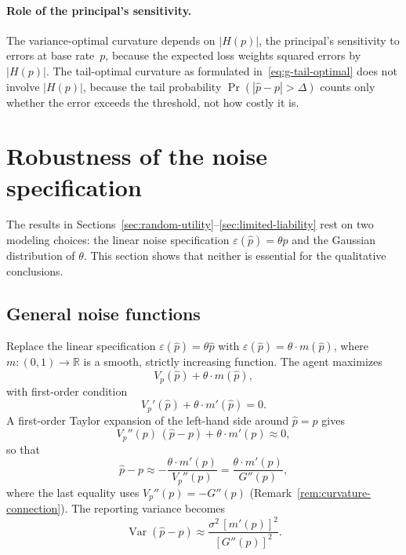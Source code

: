 \documentclass[11pt]{article}
\begin{document}
\paragraph{Role of the principal's sensitivity.} The variance-optimal curvature depends on $|H(p)|$, the principal's sensitivity to errors at base rate~$p$, because the expected loss weights squared errors by $|H(p)|$. The tail-optimal curvature as formulated in~\eqref{eq:g-tail-optimal} does not involve $|H(p)|$, because the tail probability $\Pr(|\hat{p} - p| > \Delta)$ counts only whether the error exceeds the threshold, not how costly it is. 

\section{Robustness of the noise specification}\label{sec:robustness}

The results in Sections~\ref{sec:random-utility}--\ref{sec:limited-liability} rest on two modeling choices: the linear noise specification $\varepsilon(\hat{p}) = \theta\hat{p}$ and the Gaussian distribution of $\theta$. This section shows that neither is essential for the qualitative conclusions.

\subsection{General noise functions}

Replace the linear specification $\varepsilon(\hat{p}) = \theta\hat{p}$ with $\varepsilon(\hat{p}) = \theta \cdot m(\hat{p})$, where $m \colon (0,1) \to \mathbb{R}$ is a smooth, strictly increasing function. The agent maximizes
\[
V_p(\hat{p}) + \theta \cdot m(\hat{p}),
\]
with first-order condition
\begin{equation}\label{eq:general-foc}
V_p'(\hat{p}) + \theta \cdot m'(\hat{p}) = 0.
\end{equation}
A first-order Taylor expansion of the left-hand side around $\hat{p} = p$ gives
\[
V_p''(p)\,(\hat{p} - p) + \theta \cdot m'(p) \approx 0,
\]
so that
\begin{equation}\label{eq:general-approx}
\hat{p} - p \approx -\frac{\theta \cdot m'(p)}{V_p''(p)} = \frac{\theta \cdot m'(p)}{G''(p)},
\end{equation}
where the last equality uses $V_p''(p) = -G''(p)$ (Remark~\ref{rem:curvature-connection}). The reporting variance becomes
\begin{equation}\label{eq:general-var}
\operatorname{Var}(\hat{p} - p) \approx \frac{\sigma^2\,[m'(p)]^2}{[G''(p)]^2}.
\end{equation}
\end{document}
